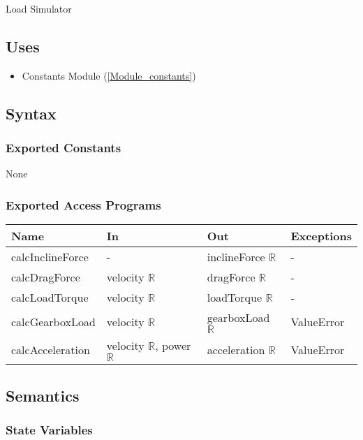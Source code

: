 \documentclass[12pt, titlepage]{article}
\begin{document}
Load Simulator

\subsection{Uses}

\begin{itemize}
  \item Constants Module (\ref{Module_constants})
\end{itemize}

\subsection{Syntax}

\subsubsection{Exported Constants}
None

\subsubsection{Exported Access Programs}

\begin{center}
\begin{tabular}{p{4cm} p{4cm} p{4cm} p{2cm}}
\hline
\textbf{Name} & \textbf{In} & \textbf{Out} & \textbf{Exceptions} \\
\hline
calcInclineForce & - & inclineForce $\mathbb{R}$ & - \\
calcDragForce & velocity $\mathbb{R}$ & dragForce $\mathbb{R}$ & - \\
calcLoadTorque & velocity $\mathbb{R}$ & loadTorque $\mathbb{R}$ & - \\
calcGearboxLoad & velocity $\mathbb{R}$ & gearboxLoad $\mathbb{R}$ & ValueError \\
calcAcceleration & velocity $\mathbb{R}$, power $\mathbb{R}$ & acceleration $\mathbb{R}$ & ValueError \\
\hline
\end{tabular}
\end{center}

\subsection{Semantics}

\subsubsection{State Variables}
\end{document}
